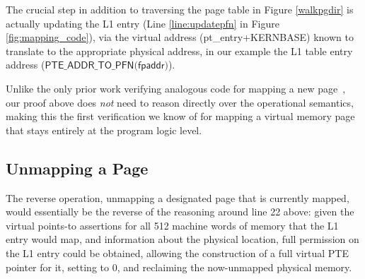 The crucial step in addition to traversing the page table in Figure \ref{walkpgdir} is actually updating the L1 entry (Line \ref{line:updatepfn} in Figure \ref{fig:mapping_code}),
via the virtual address (\textsf{pt\_entry+KERNBASE}) known to translate to the appropriate physical address, in our example the L1
table entry address ($\textsf{PTE\_ADDR\_TO\_PFN(fpaddr)}$).

Unlike the only prior work verifying analogous code for mapping a new page~\cite{kolanski08vstte,kolanski09tphols}, our proof above
does \emph{not} need to reason directly over the operational semantics,
making this the first verification we know of for mapping a virtual memory page that 
stays entirely at the program logic level.
\ifPLDI
\else
\subsection{Unmapping a Page}
The reverse operation, unmapping a designated page that is currently mapped,
would essentially be the reverse of
the reasoning around line 22 above: given the virtual points-to assertions for all 512
machine words of memory that the L1 entry would map,
and information about the physical location, 
full permission on the L1 entry could be obtained, allowing the construction of a
full virtual PTE pointer for it, setting to 0, and reclaiming the now-unmapped physical memory.
\fi


